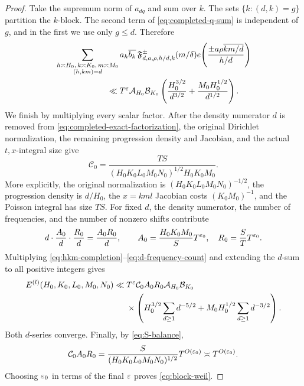 \begin{proof}
Take the supremum norm of $a_{dq}$ and sum over $k$.  The sets
$\{k:(d,k)=g\}$ partition the $k$-block.  The second term of
\eqref{eq:completed-q-sum} is independent of $g$, and in the first we use
only $g\leq d$.  Therefore
\begin{align}
 &\sum_{\substack{h\asymp H_0,\,k\asymp K_0,\,m\asymp M_0\\(h,km)=d}}
 a_h\overline{b_k}\,
 \mathfrak F_{d,a,\rho,h/d,k}^{\pm}(m/\delta)
 e\!\left(\frac{\pm a\rho\overline{km/d}}{h/d}\right)
 \notag\\
 &\hspace{22mm}\ll
 T^\eps\mathcal A_{H_0}\mathcal B_{K_0}
 \left(\frac{H_0^{3/2}}{d^{3/2}}
       +\frac{M_0H_0^{1/2}}{d^{1/2}}\right).
 \label{eq:hkm-completion}
\end{align}
We finish by multiplying every scalar factor.  After the density numerator
$d$ is removed from \eqref{eq:completed-exact-factorization}, the original
Dirichlet normalization, the remaining progression density and Jacobian,
and the actual $t,x$-integral size give
\begin{equation}\label{eq:block-normalization}
 \mathcal C_0=
 \frac{TS}{(H_0K_0L_0M_0N_0)^{1/2}H_0K_0M_0}.
\end{equation}
More explicitly, the original normalization is
$(H_0K_0L_0M_0N_0)^{-1/2}$, the progression density is $d/H_0$, the
$x=kml$ Jacobian costs $(K_0M_0)^{-1}$, and the Poisson integral has size
$TS$.  For fixed $d$, the density numerator, the number of frequencies,
and the number of nonzero shifts contribute
\begin{equation}\label{eq:d-frequency-count}
 d\cdot\frac{A_0}{d}\cdot\frac{R_0}{d}
 =\frac{A_0R_0}{d},\qquad
 A_0=\frac{H_0K_0M_0}{S}T^{\varepsilon_0},\quad
 R_0=\frac ST T^{\varepsilon_0}.
\end{equation}
Multiplying \eqref{eq:hkm-completion}--\eqref{eq:d-frequency-count} and
extending the $d$-sum to all positive integers gives
\begin{align}
 E^{(l)}(H_0,K_0,L_0,M_0,N_0)
 \ll{}&T^\varepsilon\mathcal C_0A_0R_0
 \mathcal A_{H_0}\mathcal B_{K_0}\notag\\
 &\times\left(
 H_0^{3/2}\sum_{d\geq1}d^{-5/2}
 +M_0H_0^{1/2}\sum_{d\geq1}d^{-3/2}\right).
 \label{eq:completed-d-series}
\end{align}
Both $d$-series converge.  Finally, by \eqref{eq:S-balance},
\begin{equation}\label{eq:completed-scalar-cancellation}
 \mathcal C_0A_0R_0
 =\frac{S}{(H_0K_0L_0M_0N_0)^{1/2}}T^{O(\varepsilon_0)}
 \asymp T^{O(\varepsilon_0)}.
\end{equation}
Choosing $\varepsilon_0$ in terms of the final $\varepsilon$ proves
\eqref{eq:block-weil}.
\end{proof}

